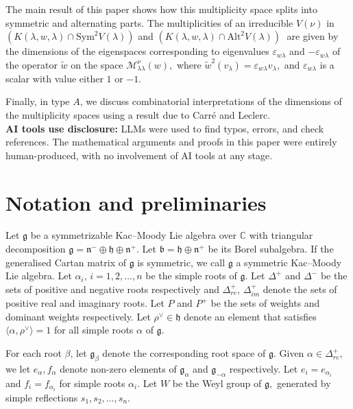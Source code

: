 \documentclass[12pt,reqno]{amsart}
\theoremstyle{plain}
\theoremstyle{definition}
\theoremstyle{plain}
\newcommand{\posreal}[1][+]{\Delta_{re}^{#1}}
\newcommand{\posimag}{\Delta_{im}^+}
\newcommand{\lie}{\mathfrak}
\begin{document}
The main result of this paper shows how this multiplicity space splits into symmetric and alternating parts. The  multiplicities of an irreducible $V(\nu)$ in $(K(\lambda, w, \lambda)\cap \text{Sym}^2V(\lambda))$ and $(K(\lambda, w, \lambda)\cap \text{Alt}^2V(\lambda))\;$ are given by the dimensions of the eigenspaces corresponding to eigenvalues $\varepsilon_{w\lambda}$ and $-\varepsilon_{w\lambda}$ of the operator $\widetilde {w}$ on the space $\mathcal{M}_{\lambda\lambda}^{\nu}(w),$ where $\widetilde{w}^2(v_{\lambda})=\varepsilon_{w\lambda}v_\lambda,$ and $\varepsilon_{w\lambda}$ is a scalar with value either $1$ or $-1.$ 

Finally, in type $A$, we discuss combinatorial interpretations of the dimensions of the multiplicity spaces using a result due to Carré and Leclerc.\\

\noindent\textbf{AI tools use disclosure:} LLMs were used to find typos, errors, and check references. The mathematical arguments and proofs in this paper were entirely human-produced, with no involvement of AI tools at any stage.

\section{Notation and preliminaries}
Let $\lie g$ be a symmetrizable Kac--Moody Lie algebra over $\mathbb{C}$ with triangular decomposition $\mathfrak{g}=\mathfrak{n}^{-}\oplus \mathfrak{h} \oplus\mathfrak{n}^{+}$. Let $\mathfrak{b}=\mathfrak h\oplus \mathfrak{n}^+$ be its Borel subalgebra. 
If the generalised Cartan matrix of $\lie g$ is symmetric, we call $\lie g$ a symmetric Kac--Moody Lie algebra. Let $\alpha_i, \,i=1,2,\ldots,n$ be the simple roots of $\mathfrak{g}$. Let $\Delta^+$ and $\Delta^-$ be the sets of positive and negative roots respectively and $\posreal, \,\posimag$ denote the sets of positive real and imaginary roots. Let $P$ and $P^+$ be the sets of weights and dominant weights respectively. Let $\rho^\vee\in \lie h$ denote an element that satisfies $\langle\alpha,\rho^\vee\rangle=1$ for all simple roots $\alpha$ of $\lie g$.

For each root $\beta$, let ${\lie g}_\beta$ denote the corresponding root space of ${\lie g}$. Given $\alpha \in \posreal$, we let $e_\alpha, f_\alpha$ denote non-zero elements of ${\lie g}_\alpha$ and ${\lie g}_{-\alpha}$ respectively. Let $e_i=e_{\alpha_i}$ and $f_i=f_{\alpha_i}$ for simple roots $\alpha_i.$ Let $W$ be the Weyl group of $\lie g,$ generated by simple reflections $s_1,s_2,\ldots,s_n.$
\end{document}
